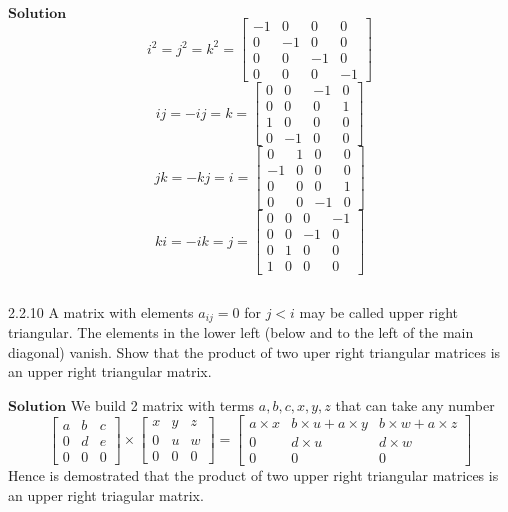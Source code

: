 $\boxed{\textbf{Solution}}$ 
$$i^2=j^2 = k^2 =\begin{bmatrix}{-1} & {0} & {0} & {0} \\ {0} & {-1} & {0} & {0} \\ {0} & {0} & {-1} & {0} \\ {0} & {0} & {0} & {-1}\end{bmatrix}$$
$$ij = -ij = k =\begin{bmatrix}{0} & {0} & {-1} & {0} \\ {0} & {0} & {0} & {1} \\ {1} & {0} & {0} & {0} \\ {0} & {-1} & {0} & {0}\end{bmatrix} $$
$$jk=-kj=i=\begin{bmatrix}{0} & {1} & {0} & {0} \\ {-1} & {0} & {0} & {0} \\ {0} & {0} & {0} & {1} \\ {0} & {0} & {-1} & {0}\end{bmatrix}$$
$$ki=-ik=j = \begin{bmatrix}{0} & {0} & {0} & {-1} \\ {0} & {0} & {-1} & {0} \\ {0} & {1} & {0} & {0} \\ {1} & {0} & {0} & {0}\end{bmatrix}$$

$$$$

\begin{mybox}{2.2.10}
A matrix with elements $a_{i j}=0$ for $j<i$ may be called upper right triangular. The
elements in the lower left (below and to the left of the main diagonal) vanish. Show that
the product of two uper right triangular matrices is an upper right triangular matrix. 
\end{mybox}



$\boxed{\textbf{Solution}}$ We build 2 matrix with terms $a,b,c,x,y,z$ that can take any number
$$\begin{bmatrix}{a} & {b} & {c} \\ {0} & {d} & {e} \\ {0} & {0} & {0}\end{bmatrix} \times\begin{bmatrix}{x} & {y} & {z} \\ {0} & {u} & {w} \\ {0} & {0} & {0}\end{bmatrix}=\begin{bmatrix}{a\times x} & {b \times u+a\times y} & {b \times w+a\times z} \\ {0} & {d \times u} & {d \times w} \\ {0} & {0} & {0}\end{bmatrix}$$
Hence is demostrated that the product of two upper right triangular matrices is an upper right triagular matrix.


